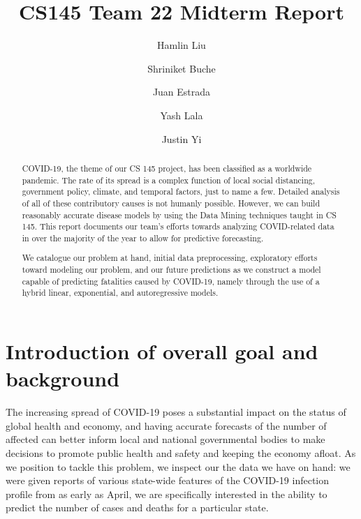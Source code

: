 \documentclass[sigconf,nonacm]{acmart}
\begin{document}
\title{CS145 Team 22 Midterm Report}

\author{Hamlin Liu}
\author{Shriniket Buche}
\author{Juan Estrada}
\author{Yash Lala}
\author{Justin Yi}
\renewcommand{\shortauthors}{Team 22}

\begin{abstract}

COVID-19, the theme of our CS 145 project, has been classified as a worldwide pandemic. 
The rate of its spread is a complex function of local social distancing, government policy, 
climate, and temporal factors, just to name a few. Detailed analysis of all of these contributory 
causes is not humanly possible. However, we can build reasonably accurate disease models by using the 
Data Mining techniques taught in CS 145. This report documents our team’s efforts towards analyzing 
COVID-related data in over the majority of the year to allow for predictive forecasting. 

We catalogue our problem at hand, initial data preprocessing, exploratory efforts toward modeling our problem, 
and our future predictions as we construct a model capable of predicting fatalities caused by COVID-19, 
namely through the use of a hybrid linear, exponential, and autoregressive models. 

\end{abstract}

\maketitle

\section{Introduction of overall goal and background}
The increasing spread of COVID-19 poses a substantial impact on the status of global health and economy, 
and having accurate forecasts of the number of affected can better inform local and national governmental 
bodies to make decisions to promote public health and safety and keeping the economy afloat. 
As we position to tackle this problem, we inspect our the data we have on hand: we were given reports of various 
state-wide features of the COVID-19 infection profile from as early as April, we are specifically interested in the ability 
to predict the number of cases and deaths for a particular state.
\end{document}
